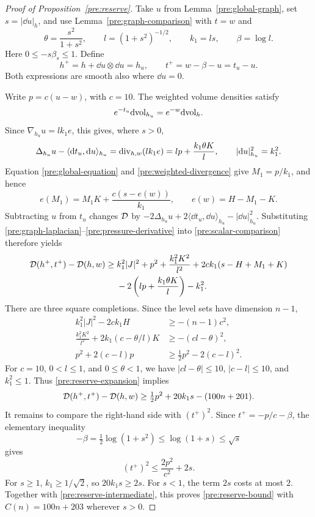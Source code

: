 \begin{proof}[Proof of Proposition~\ref{pre:reserve}]
Take $u$ from Lemma~\ref{pre:global-graph}, set $s=|\dd u|_h$, and use
Lemma~\ref{pre:graph-comparison} with $t=w$ and
\[
 \theta=\frac{s^2}{1+s^2},\qquad
 l=(1+s^2)^{-1/2},\qquad k_1=ls,\qquad\beta=\log l.
\]
Here $0\le-s\beta_s\le1$. Define
\begin{equation}\label{pre:reserve-output}
 h^+=h+\dd u\otimes\dd u=h_u,
 \qquad t^+=w-\beta-u=t_u-u.
\end{equation}
Both expressions are smooth also where $\dd u=0$.

Write $p=c(u-w)$, with $c=10$. The weighted volume densities satisfy
\[
 e^{-t_u}\mathrm d\mathrm{vol}_{h_u}=e^{-w}\mathrm d\mathrm{vol}_h.
\]
Since $\nabla_{h_u}u=lk_1e$, this gives, where $s>0$,
\begin{equation}\label{pre:graph-laplacian}
 \Delta_{h_u}u-\langle\mathrm d t_u,\mathrm d u\rangle_{h_u}
   =\operatorname{div}_{h,w}(lk_1e)
   =lp+\frac{k_1\theta K}{l},
 \qquad |\mathrm d u|_{h_u}^2=k_1^2.
\end{equation}
Equation \eqref{pre:global-equation} and
\eqref{pre:weighted-divergence} give $M_1=p/k_1$, and hence
\begin{equation}\label{pre:pressure-derivative}
 e(M_1)=M_1K+\frac{c(s-e(w))}{k_1},
 \qquad e(w)=H-M_1-K.
\end{equation}
Subtracting $u$ from $t_u$ changes $\mathcal D$ by
$-2\Delta_{h_u}u+2\langle\dd t_u,\dd u\rangle_{h_u}
-|\dd u|_{h_u}^2$. Substituting
\eqref{pre:graph-laplacian}--\eqref{pre:pressure-derivative} into
\eqref{pre:scalar-comparison} therefore yields
\begin{equation}\label{pre:reserve-expansion}
 \begin{split}
 \mathcal D(h^+,t^+)-\mathcal D(h,w)\ge{}&
 k_1^2|J|^2+p^2+\frac{k_1^2K^2}{l^2}
       +2ck_1(s-H+M_1+K)\\
 &-2\left(lp+\frac{k_1\theta K}{l}\right)-k_1^2.
 \end{split}
\end{equation}
There are three square completions. Since the level sets have dimension
$n-1$,
\[
 \begin{split}
 k_1^2|J|^2-2ck_1H&\ge-(n-1)c^2,\\
 \frac{k_1^2K^2}{l^2}+2k_1(c-\theta/l)K&\ge-(cl-\theta)^2,\\
 p^2+2(c-l)p&\ge\tfrac12p^2-2(c-l)^2.
 \end{split}
\]
For $c=10$, $0<l\le1$, and $0\le\theta<1$, we have
$|cl-\theta|\le10$, $|c-l|\le10$, and $k_1^2\le1$.
Thus \eqref{pre:reserve-expansion} implies
\begin{equation}\label{pre:reserve-intermediate}
 \mathcal D(h^+,t^+)-\mathcal D(h,w)
       \ge\tfrac12p^2+20k_1s-(100n+201).
\end{equation}
It remains to compare the right-hand side with $(t^+)^2$.
Since $t^+=-p/c-\beta$, the elementary inequality
\[
 -\beta=\tfrac12\log(1+s^2)\le\log(1+s)\le\sqrt s
\]
gives
\[
 (t^+)^2\le\frac{2p^2}{c^2}+2s.
\]
For $s\ge1$, $k_1\ge1/\sqrt2$, so $20k_1s\ge2s$.
For $s<1$, the term $2s$ costs at most $2$.
Together with \eqref{pre:reserve-intermediate}, this proves
\eqref{pre:reserve-bound} with $C(n)=100n+203$ wherever $s>0$.


\end{proof}

